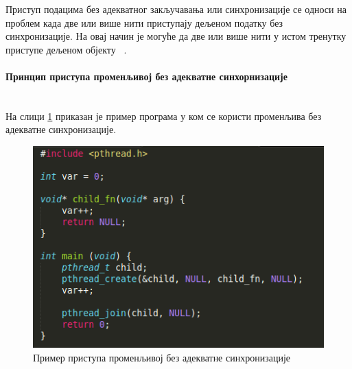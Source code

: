 \documentclass[12pt,oneside]{memoir}
\begin{document}
\indent Приступ подацима без адекватног закључавања или синхронизације се односи на проблем када две или више нити приступају дељеном податку без синхронизације. На овај начин је могуће да две или више нити у истом тренутку приступе дељеном објекту ~\cite{helgrindRef}.

\paragraph{Принцип приступа променљивој без адекватне синхорнизације}\mbox{} \\ 

\indent На слици \ref{fig:main4} приказан је пример програма у ком се користи променљива без адекватне синхронизације.

\begin{figure}[h!]
\begin{center}
\includegraphics[scale=0.75]{slika14.png}
\end{center}
\caption{Пример приступа променљивој без адекватне синхронизације}
\label{fig:main4}
\end{figure}
\end{document}
